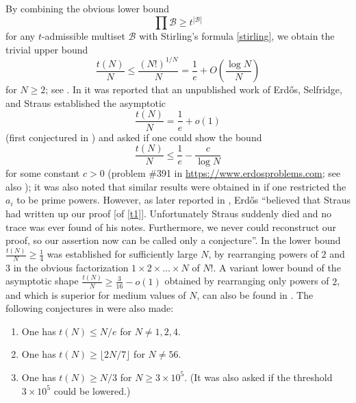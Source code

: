 \documentclass[12pt,a4paper,reqno]{amsart}
\numberwithin{equation}{section}
\theoremstyle{plain}
\theoremstyle{definition}
\newcommand\tuple{{\mathcal B}}
\begin{document}
By combining the obvious lower bound
\begin{equation}\label{obvious}
 \prod \tuple \geq t^{|\tuple|}
\end{equation}
for any $t$-admissible multiset $\tuple$ with Stirling's formula \eqref{stirling}, we obtain the trivial upper bound
\begin{equation}\label{trivial} \frac{t(N)}{N} \leq \frac{(N!)^{1/N}}{N} = \frac{1}{e} + O\left( \frac{\log N}{N}\right)
\end{equation}
for $N \geq 2$; see .  In \cite[p.75]{erdos-graham} it was reported that an unpublished work of Erd\H{o}s, Selfridge, and Straus established the asymptotic
\begin{equation}\label{t1}
  \frac{t(N)}{N} = \frac{1}{e} + o(1)
\end{equation}
(first conjectured in \cite{erdos-71}) and asked if one could show the bound
\begin{equation}\label{Tbound}
   \frac{t(N)}{N} \leq \frac{1}{e} - \frac{c}{\log N}
\end{equation}
for some constant $c>0$ (problem {\#}391 in \url{https://www.erdosproblems.com}; see also \cite[Section B22, p. 122--123]{guy}); it was also noted that similar results were obtained in \cite{algr77} if one restricted the $a_i$ to be prime powers.  However, as later reported in \cite{erdos-96}, Erd\H{o}s ``believed that Straus had written up our proof [of \eqref{t1}]. Unfortunately Straus suddenly died and no trace was ever found of his notes. Furthermore, we never could reconstruct our proof, so our assertion now can be called only a conjecture''.   In \cite{guy} the lower bound $\frac{t(N)}{N} \geq \frac{1}{4}$ was established for sufficiently large $N$, by rearranging powers of $2$ and $3$ in the obvious factorization $1 \times 2 \times \dots \times N$ of $N!$.  A variant lower bound of the asymptotic shape $\frac{t(N)}{N} \geq \frac{3}{16}-o(1)$ obtained by rearranging only powers of $2$, and which is superior for medium values of $N$, can also be found in \cite{guy}.  The following conjectures in \cite{guy} were also made:
\begin{enumerate}
\item One has $t(N) \leq N/e$ for $N \neq 1,2,4$.
\item One has $t(N) \geq \lfloor 2N/7 \rfloor$ for $N \neq 56$.
\item One has $t(N) \geq N/3$ for $N \geq 3 \times 10^5$.  (It was also asked if the threshold $3 \times 10^5$ could be lowered.) 
\end{enumerate}
\end{document}
